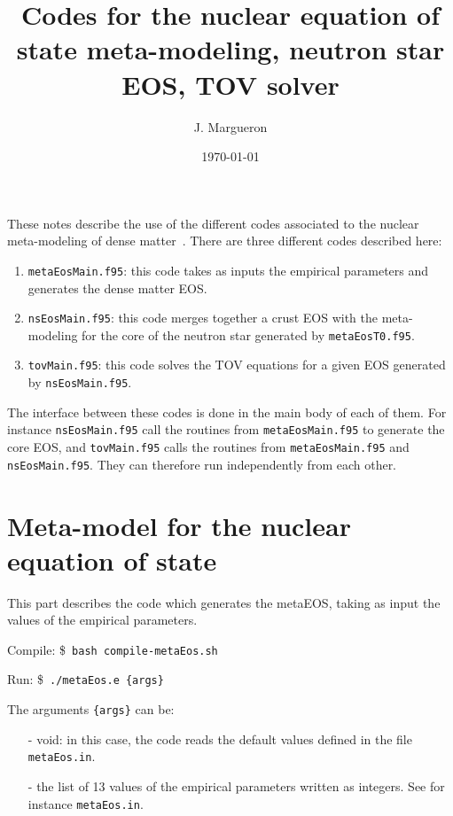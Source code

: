 \documentclass[11pt]{article}
\newcommand{\code}[1]{\colorbox{light-gray}{\mbox{\texttt{#1}}}}
\newcommand{\bash}[1]{\colorbox{light-gray}{\mbox{\$ \texttt{#1}}}}
\begin{document}
\title{Codes for the nuclear equation of state meta-modeling, neutron star EOS, TOV solver}
\author{J. Margueron}
\date{\today}
\maketitle

These notes describe the use of the different codes associated to the nuclear meta-modeling of dense matter~\cite{Margueron2018a,Margueron2018b}. There are three different codes described here:
\begin{enumerate}
\item \code{metaEosMain.f95}: this code takes as inputs the empirical parameters and generates the dense matter EOS.
\item \code{nsEosMain.f95}: this code merges together a crust EOS with the meta-modeling for the core of the neutron star generated by \code{metaEosT0.f95}.
\item \code{tovMain.f95}: this code solves the TOV equations for a given EOS generated by \code{nsEosMain.f95}.
\end{enumerate}

The interface between these codes is done in the main body of each of them. For instance \code{nsEosMain.f95} call the routines from \code{metaEosMain.f95} to generate the core EOS, and \code{tovMain.f95} calls the routines from \code{metaEosMain.f95}  and
\code{nsEosMain.f95}. They can therefore run independently from each other.


\section{Meta-model for the nuclear equation of state}
\label{sec:metaEOS}

This part describes the code which generates the metaEOS, taking as input the values of the empirical parameters.

Compile: \bash{bash compile-metaEos.sh}

Run: \bash{./metaEos.e \{args\}}

The arguments \code{\{args\}} can be:
\begin{enumerate}
\item[-] void: in this case, the code reads the default values defined in the file \code{metaEos.in}.
\item[-] the list of 13 values of the empirical parameters written as integers. See for instance  \code{metaEos.in}.
\end{enumerate}
\end{document}
